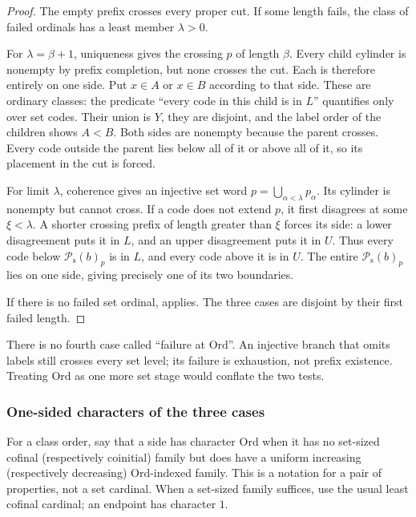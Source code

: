 \documentclass[11pt]{article}
\theoremstyle{definition}
\theoremstyle{remark}
\newcommand{\Ord}{\mathrm{Ord}}
\newcommand{\Psupp}{\mathcal P_{\mathrm{s}}}
\begin{document}
\begin{proof}
The empty prefix crosses every proper cut. If some length fails, the
class of failed ordinals has a least member $\lambda>0$.

For $\lambda=\beta+1$, uniqueness gives the crossing $p$ of length
$\beta$. Every child cylinder is nonempty by prefix completion, but
none crosses the cut. Each is therefore entirely on one side. Put
$x\in A$ or $x\in B$ according to that side. These are ordinary
classes: the predicate ``every code in this child is in $L$'' quantifies
only over set codes. Their union is $Y$, they are disjoint, and the
label order of the children shows $A<B$. Both sides are nonempty
because the parent crosses. Every code outside the parent lies below
all of it or above all of it, so its placement in the cut is forced.

For limit $\lambda$, coherence gives an injective set word
$p=\bigcup_{\alpha<\lambda}p_\alpha$. Its cylinder is nonempty but
cannot cross. If a code does not extend $p$, it first disagrees at
some $\xi<\lambda$. A shorter crossing prefix of length greater than
$\xi$ forces its side: a lower disagreement puts it in $L$, and an
upper disagreement puts it in $U$. Thus every code below $\Psupp(b)_p$ is
in $L$, and every code above it is in $U$. The entire $\Psupp(b)_p$ lies on
one side, giving precisely one of its two boundaries.

If there is no failed set ordinal, 
applies. The three cases are disjoint by their first failed length.
\end{proof}

There is no fourth case called ``failure at $\Ord$''. An injective
branch that omits labels still crosses every set level; its failure
is exhaustion, not prefix existence. Treating $\Ord$ as one more set
stage would conflate the two tests.

\subsubsection{One-sided characters of the three cases}

For a class order, say that a side has character $\Ord$ when it has
no set-sized cofinal (respectively coinitial) family but does have a
uniform increasing (respectively decreasing) $\Ord$-indexed family.
This is a notation for a pair of properties, not a set cardinal.
When a set-sized family suffices, use the usual least cofinal cardinal;
an endpoint has character $1$.
\end{document}
